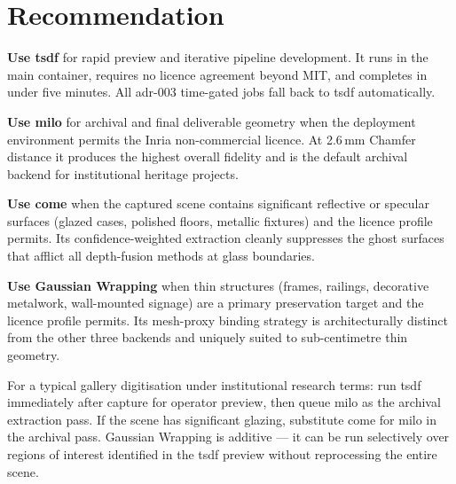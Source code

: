 \section{Recommendation}
\label{sec:meshing-recommendation}

\begin{recommendation}
  \textbf{Use \acrshort{tsdf}} for rapid preview and iterative pipeline development. It runs in the main container, requires no licence agreement beyond MIT, and completes in under five minutes. All \acrshort{adr}-003 time-gated jobs fall back to \acrshort{tsdf} automatically.

  \textbf{Use \acrshort{milo}} for archival and final deliverable geometry when the deployment environment permits the Inria non-commercial licence. At \num{2.6}\,mm Chamfer distance it produces the highest overall fidelity and is the default archival backend for institutional heritage projects.

  \textbf{Use \acrshort{come}} when the captured scene contains significant reflective or specular surfaces (glazed cases, polished floors, metallic fixtures) and the licence profile permits. Its confidence-weighted extraction cleanly suppresses the ghost surfaces that afflict all depth-fusion methods at glass boundaries.

  \textbf{Use Gaussian Wrapping} when thin structures (frames, railings, decorative metalwork, wall-mounted signage) are a primary preservation target and the licence profile permits. Its mesh-proxy binding strategy is architecturally distinct from the other three backends and uniquely suited to sub-centimetre thin geometry.

  For a typical gallery digitisation under institutional research terms: run \acrshort{tsdf} immediately after capture for operator preview, then queue \acrshort{milo} as the archival extraction pass. If the scene has significant glazing, substitute \acrshort{come} for \acrshort{milo} in the archival pass. Gaussian Wrapping is additive --- it can be run selectively over regions of interest identified in the \acrshort{tsdf} preview without reprocessing the entire scene.
\end{recommendation}
